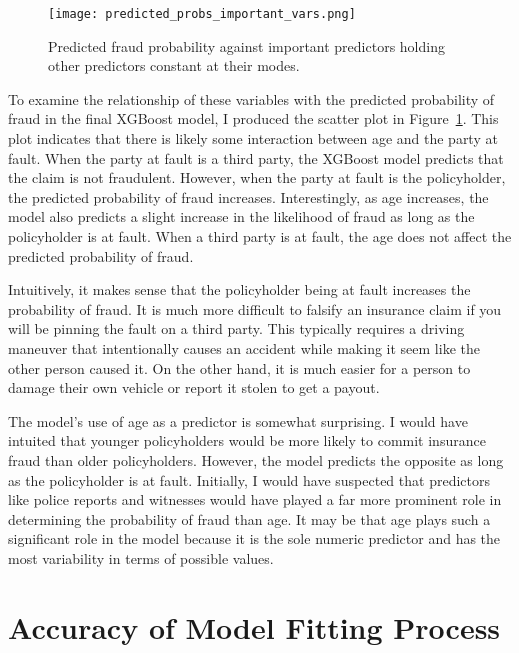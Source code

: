 \documentclass{article}
\begin{document}
\begin{figure}
    \centering
    \texttt{[image: predicted\_probs\_important\_vars.png]}
    \caption{Predicted fraud probability against important predictors holding other predictors 
    constant at their modes.}
    \label{fig:pred_probs}
\end{figure}

To examine the relationship of these variables with the predicted probability of fraud in the final 
XGBoost model, I produced the scatter plot in Figure~\ref{fig:pred_probs}.  This plot indicates that 
there is likely some interaction between age and the party at fault.  When the party at fault is a 
third party, the XGBoost model predicts that the claim is not fraudulent. However, when the party at 
fault is the policyholder, the predicted probability of fraud increases.  Interestingly, as age 
increases, the model also predicts a slight increase in the likelihood of fraud as long as the 
policyholder is at fault. When a third party is at fault, the age does not affect the predicted 
probability of fraud.

Intuitively, it makes sense that the policyholder being at fault increases the probability of fraud.  
It is much more difficult to falsify an insurance claim if you will be pinning the fault on a third 
party.  This typically requires a driving maneuver that intentionally causes an accident while making 
it seem like the other person caused it.  On the other hand, it is much easier for a person to damage 
their own vehicle or report it stolen to get a payout.   

The model's use of age as a predictor is somewhat surprising. I would have intuited that younger 
policyholders would be more likely to commit insurance fraud than older policyholders.  However, the 
model predicts the opposite as long as the policyholder is at fault.  Initially, I would have suspected 
that predictors like police reports and witnesses would have played a far more prominent role in 
determining the probability of fraud than age.  It may be that age plays such a significant role in the 
model because it is the sole numeric predictor and has the most variability in terms of possible values.

\section{Accuracy of Model Fitting Process}
\end{document}
